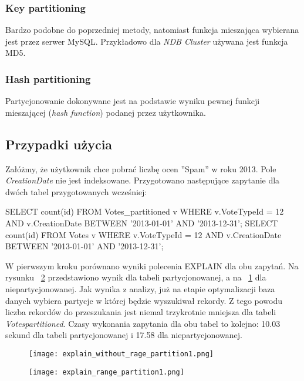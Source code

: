 \subsubsection{Key partitioning}
Bardzo podobne do poprzedniej metody, natomiast funkcja mieszająca wybierana jest przez serwer MySQL. Przykładowo dla \textit{NDB Cluster} używana jest funkcja MD5.
\subsubsection{Hash partitioning}
Partycjonowanie dokonywane jest na podstawie wyniku pewnej funkcji mieszającej (\textit{hash function}) podanej przez użytkownika.

\subsection{Przypadki użycia}
Załóżmy, że użytkownik chce pobrać liczbę ocen ''Spam'' w roku 2013. Pole \textit{CreationDate} nie jest indeksowane. Przygotowano następujące zapytanie dla dwóch tabel przygotowanych wcześniej:
\begin{spverbatim}
	SELECT count(id) FROM Votes_partitioned v WHERE v.VoteTypeId = 12 AND v.CreationDate BETWEEN '2013-01-01' AND '2013-12-31'; 
	SELECT count(id) FROM Votes v WHERE v.VoteTypeId = 12 AND v.CreationDate BETWEEN '2013-01-01' AND '2013-12-31';
\end{spverbatim}
W pierwszym kroku porównano wyniki polecenia EXPLAIN dla obu zapytań. Na rysunku ~\ref{fig:explain_range_partition1} przedstawiono wynik dla tabeli partycjonowanej, a na ~\ref{fig:explain_without_rage_partition1} dla niepartycjonowanej. Jak wynika z analizy, już na etapie optymalizacji baza danych wybiera partycje w której będzie wyszukiwał rekordy. Z tego powodu liczba rekordów do przeszukania jest niemal trzykrotnie mniejsza dla tabeli \textit{Votes\textunderscore partitioned}. Czasy wykonania zapytania dla obu tabel to kolejno: 10.03 sekund dla tabeli partycjonowanej i 17.58 dla niepartycjonowanej.
\begin{figure}
	\caption{}
	\centering
	\texttt{[image: explain\_without\_rage\_partition1.png]}
	\label{fig:explain_without_rage_partition1}
\end{figure}
\begin{figure}
	\caption{}
	\centering
	\texttt{[image: explain\_range\_partition1.png]}
	\label{fig:explain_range_partition1}
\end{figure}

